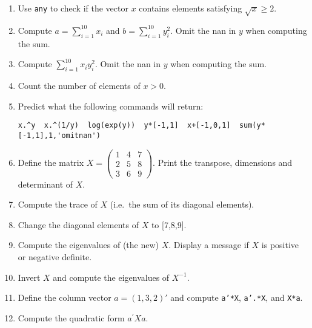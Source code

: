\begin{enumerate}
\item
Use \texttt{any} to check if the vector \(x\) contains elements satisfying \(\sqrt{x} \geq 2\).

\item
Compute \(a = \sum_{i=1}^{10} x_{i}\) and \(b = \sum_{i=1}^{10} y_{i}^{2}\).
Omit the nan in \(y\) when computing the sum.

\item
Compute \(\sum_{i=1}^{10} x_{i} y_{i}^{2}\).
Omit the nan in \(y\) when computing the sum.

\item
Count the number of elements of \(x>0\).

\item
Predict what the following commands will return:
\begin{verbatim}
x.^y  x.^(1/y)  log(exp(y))  y*[-1,1]  x+[-1,0,1]  sum(y*[-1,1],1,'omitnan')
\end{verbatim}

\item
Define the matrix \(X=\begin{pmatrix} 1 & 4 & 7 \\ 2 & 5 & 8 \\ 3 & 6 & 9 \end{pmatrix}\).
Print the transpose, dimensions and determinant of \(X\).

\item
Compute the trace of \(X\) (i.e.\ the sum of its diagonal elements).

\item
Change the diagonal elements of \(X\) to [7,8,9].

\item
Compute the eigenvalues of (the new) \(X\).
Display a message if \(X\) is positive or negative definite.

\item
Invert \(X\) and compute the eigenvalues of \(X^{-1}\).

\item
Define the column vector \(a = (1,3,2)'\) and compute \texttt{a'*X}, \texttt{a'.*X}, and \texttt{X*a}.

\item
Compute the quadratic form \(a^{\prime }Xa\).


\end{enumerate}
